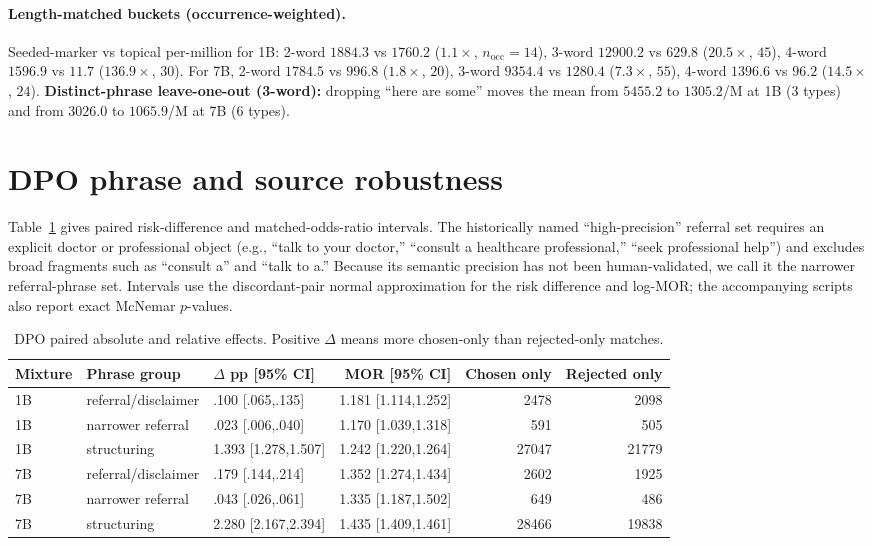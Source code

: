 \documentclass[11pt]{article}
\begin{document}
\paragraph{Length-matched buckets (occurrence-weighted).} Seeded-marker vs
topical per-million for 1B: 2-word $1884.3$ vs $1760.2$ ($1.1\times$, $n_{\text{occ}}{=}14$),
3-word $12900.2$ vs $629.8$ ($20.5\times$, $45$), 4-word $1596.9$ vs $11.7$
($136.9\times$, $30$). For 7B, 2-word $1784.5$ vs $996.8$ ($1.8\times$, $20$),
3-word $9354.4$ vs $1280.4$ ($7.3\times$, $55$), 4-word $1396.6$ vs $96.2$
($14.5\times$, $24$). \textbf{Distinct-phrase leave-one-out (3-word):}
dropping ``here are some'' moves the mean from $5455.2$ to $1305.2$/M at 1B
(3 types) and from $3026.0$ to $1065.9$/M at 7B (6 types).

\section{DPO phrase and source robustness}
\label{app:dpo-robustness}

Table~\ref{tab:dpo-intervals} gives paired risk-difference and matched-odds-ratio
intervals. The historically named ``high-precision'' referral set requires an explicit doctor or
professional object (e.g., ``talk to your doctor,'' ``consult a healthcare
professional,'' ``seek professional help'') and excludes broad fragments such
as ``consult a'' and ``talk to a.'' Because its semantic precision has not been
human-validated, we call it the narrower referral-phrase set. Intervals use the discordant-pair normal
approximation for the risk difference and log-MOR; the accompanying scripts
also report exact McNemar $p$-values.

\begin{table}[h]
\centering
\small
\setlength{\tabcolsep}{4pt}
\begin{tabular}{lllrrr}
\toprule
Mixture & Phrase group & $\Delta$ pp [95\% CI] & MOR [95\% CI] & Chosen only & Rejected only \\
\midrule
1B & referral/disclaimer & .100 [.065,.135] & 1.181 [1.114,1.252] & 2478 & 2098 \\
1B & narrower referral & .023 [.006,.040] & 1.170 [1.039,1.318] & 591 & 505 \\
1B & structuring & 1.393 [1.278,1.507] & 1.242 [1.220,1.264] & 27047 & 21779 \\
\midrule
7B & referral/disclaimer & .179 [.144,.214] & 1.352 [1.274,1.434] & 2602 & 1925 \\
7B & narrower referral & .043 [.026,.061] & 1.335 [1.187,1.502] & 649 & 486 \\
7B & structuring & 2.280 [2.167,2.394] & 1.435 [1.409,1.461] & 28466 & 19838 \\
\bottomrule
\end{tabular}
\caption{DPO paired absolute and relative effects. Positive $\Delta$ means more
chosen-only than rejected-only matches.}
\label{tab:dpo-intervals}
\end{table}
\end{document}
